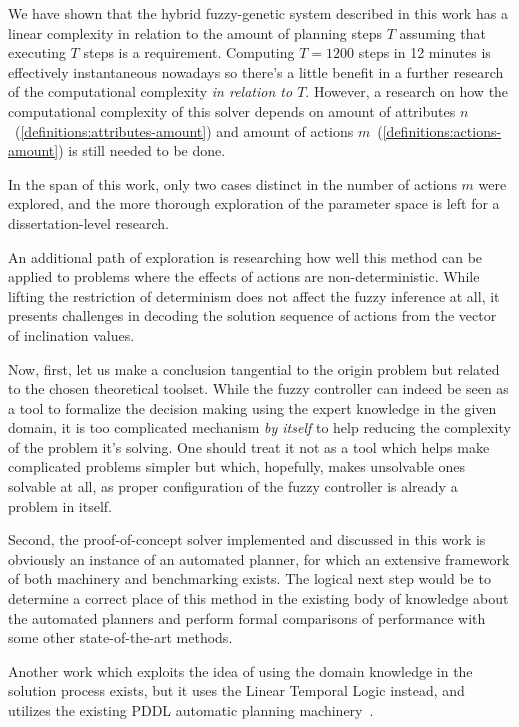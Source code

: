 \documentclass[12pt, a4paper]{report}
\begin{document}
	We have shown that the hybrid fuzzy-genetic system described in this work has a linear complexity in relation to the amount of planning steps $T$ assuming that executing $T$ steps is a requirement.
	Computing $T=1200$ steps in 12 minutes is effectively instantaneous nowadays so there's a little benefit in a further research of the computational complexity \textit{in relation to $T$}.
	However, a research on how the computational complexity of this solver depends on amount of attributes $n$~(\ref{definitions:attributes-amount}) and amount of actions $m$~(\ref{definitions:actions-amount}) is still needed to be done.

	In the span of this work, only two cases distinct in the number of actions $m$ were explored, and the more thorough exploration of the parameter space is left for a dissertation-level research.
	
	An additional path of exploration is researching how well this method can be applied to problems where the effects of actions are non-deterministic.
	While lifting the restriction of determinism does not affect the fuzzy inference at all, it presents challenges in decoding the solution sequence of actions from the vector of inclination values.
	
	Now, first, let us make a conclusion tangential to the origin problem but related to the chosen theoretical toolset.
	While the fuzzy controller can indeed be seen as a tool to formalize the decision making using the expert knowledge in the given domain, it is too complicated mechanism \textit{by itself} to help reducing the complexity of the problem it's solving.
	One should treat it not as a tool which helps make complicated problems simpler but which, hopefully, makes unsolvable ones solvable at all, as proper configuration of the fuzzy controller is already a problem in itself.

	Second, the proof-of-concept solver implemented and discussed in this work is obviously an instance of an automated planner, for which an extensive framework of both machinery and benchmarking exists.
	The logical next step would be to determine a correct place of this method in the existing body of knowledge about the automated planners and perform formal comparisons of performance with some other state-of-the-art methods.

	Another work which exploits the idea of using the domain knowledge in the solution process exists, but it uses the Linear Temporal Logic instead, and utilizes the existing PDDL automatic planning machinery~\cite{LU2025121666}.
\end{document}

